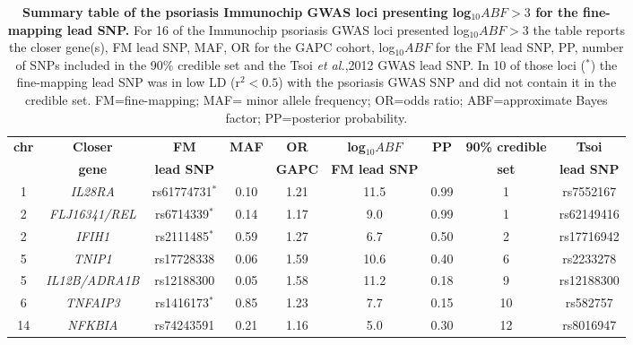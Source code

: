 \begin{landscape}
\begin{center}
\begin{longtable}[ht]{c c c c c c c c c}
\caption[Summary table of the psoriasis Immunochip GWAS loci presenting log${_10}ABF>3$ for the fine-mapping lead SNP.]{\textbf{Summary table of the psoriasis Immunochip GWAS loci presenting log${_10}ABF>3$ for the fine-mapping lead SNP.} For 16 of the Immunochip psoriasis GWAS loci presented log${_10}ABF>3$ the table reports the closer gene(s), FM lead SNP, MAF, OR for the GAPC cohort, log${_10}ABF$ for the FM lead SNP, PP, number of SNPs included in the 90\% credible set and the Tsoi \textit{et al.},2012 GWAS lead SNP. In 10 of those loci ($^{\ast}$) the fine-mapping lead SNP was in low LD (r${^2}<0.5$) with the psoriasis GWAS SNP and did not contain it in the credible set. FM=fine-mapping; MAF= minor allele frequency; OR=odds ratio; ABF=approximate Bayes factor; PP=posterior probability.}
\label{tab:Psoriasis_fine_mapping_summary} \\
\toprule
\textbf{chr} & \textbf{Closer} & \textbf{FM} & \textbf{MAF} & \textbf{OR} & \textbf{log${_10}ABF$} & \textbf{PP} & \textbf{90\% credible} &\textbf{Tsoi} \\
             & \textbf{gene} & \textbf{lead SNP} &          & \textbf{GAPC} & \textbf{FM lead SNP} &             & \textbf{set}           &\textbf{lead SNP} \\
\midrule
\midrule
1	& \textit{IL28RA}&	     rs61774731$^{\ast}$   &		0.10 &		1.21 &		11.5 &		0.99 &		1	 &	rs7552167 \\
2	& \textit{FLJ16341/REL}& rs6714339$^{\ast}$    &		0.14 &		1.17 &		9.0  &		0.99 &		1	 &	rs62149416 \\
2	& \textit{IFIH1}&		     rs2111485$^{\ast}$    &		0.59 &		1.27 &		6.7  &		0.50 &		2	 &	rs17716942 \\
5	& \textit{TNIP1}&		     rs17728338            &		0.06 &		1.59 &		10.6 &		0.40 &		6	 &	rs2233278 \\
5	& \textit{IL12B/ADRA1B}& rs12188300            &		0.05 &		1.58 &		11.2 &		0.18 &		9	 &	rs12188300 \\
6	& \textit{TNFAIP3}&		   rs1416173$^{\ast}$    &		0.85 &		1.23 &		7.7  &		0.15 &		10 &		rs582757 \\
14	& \textit{NFKBIA}&		 rs74243591            &		0.21 &		1.16 &		5.0  &		0.30 &		12 &		rs8016947 \\

\end{longtable}
\end{center}
\end{landscape}
